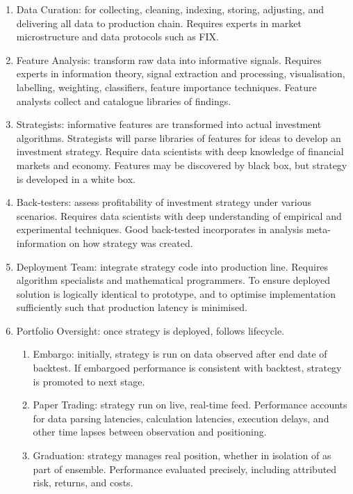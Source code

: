 \begin{method} 
\begin{enumerate}[label=\roman*.]
\setlength{\itemsep}{0pt}
\item Data Curation: for collecting, cleaning, indexing, storing, adjusting, and delivering all data to production chain. Requires experts in market microstructure and data protocols such as FIX.
\item Feature Analysis: transform raw data into informative signals. Requires experts in information theory, signal extraction and processing, visualisation, labelling, weighting, classifiers, feature importance techniques. Feature analysts collect and catalogue libraries of findings.
\item Strategists: informative features are transformed into actual investment algorithms. Strategists will parse libraries of features for ideas to develop an investment strategy. Require data scientists with deep knowledge of financial markets and economy. Features may be discovered by black box, but strategy is developed in a white box.
\item Back-testers: assess profitability of investment strategy under various scenarios. Requires data scientists with deep understanding of empirical and experimental techniques. Good back-tested incorporates in analysis meta-information on how strategy was created.
\item Deployment Team: integrate strategy code into production line. Requires algorithm specialists and mathematical programmers. To ensure deployed solution is logically identical to prototype, and to optimise implementation sufficiently such that production latency is minimised.
\item Portfolio Oversight: once strategy is deployed, follows lifecycle.
\begin{enumerate}[label=\arabic*.]
\setlength{\itemsep}{0pt}
\item Embargo: initially, strategy is run on data observed after end date of backtest. If embargoed performance is consistent with backtest, strategy is promoted to next stage.
\item Paper Trading: strategy run on live, real-time feed. Performance accounts for data parsing latencies, calculation latencies, execution delays, and other time lapses between observation and positioning. 
\item Graduation: strategy manages real position, whether in isolation of as part of ensemble. Performance evaluated precisely, including attributed risk, returns, and costs.

\end{enumerate}
\end{enumerate}
\end{method}
